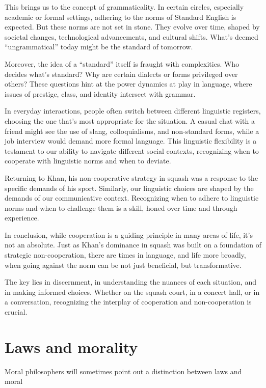 This brings us to the concept of grammaticality. In certain circles, especially academic or formal settings, adhering to the norms of Standard English is expected. But these norms are not set in stone. They evolve over time, shaped by societal changes, technological advancements, and cultural shifts. What's deemed ``ungrammatical'' today might be the standard of tomorrow.

Moreover, the idea of a ``standard'' itself is fraught with complexities. Who decides what's standard? Why are certain dialects or forms privileged over others? These questions hint at the power dynamics at play in language, where issues of prestige, class, and identity intersect with grammar.

In everyday interactions, people often switch between different linguistic registers, choosing the one that's most appropriate for the situation. A casual chat with a friend might see the use of slang, colloquialisms, and non-standard forms, while a job interview would demand more formal language. This linguistic flexibility is a testament to our ability to navigate different social contexts, recognizing when to cooperate with linguistic norms and when to deviate.

Returning to Khan, his non-cooperative strategy in squash was a response to the specific demands of his sport. Similarly, our linguistic choices are shaped by the demands of our communicative context. Recognizing when to adhere to linguistic norms and when to challenge them is a skill, honed over time and through experience.

In conclusion, while cooperation is a guiding principle in many areas of life, it's not an absolute. Just as Khan's dominance in squash was built on a foundation of strategic non-cooperation, there are times in language, and life more broadly, when going against the norm can be not just beneficial, but transformative.

The key lies in discernment, in understanding the nuances of each situation, and in making informed choices. Whether on the squash court, in a concert hall, or in a conversation, recognizing the interplay of cooperation and non-cooperation is crucial.

\section{Laws and morality}

Moral philosophers will sometimes point out a distinction between laws and moral

